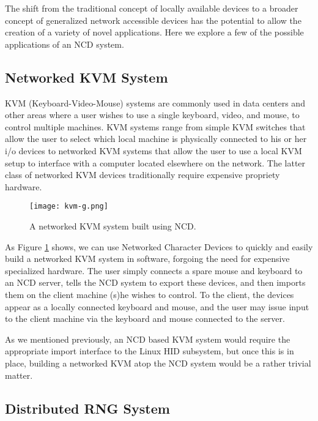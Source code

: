 \documentclass[11pt,twocolumn]{article}
\begin{document}
The shift from the traditional concept of locally available devices to a
broader concept of generalized network accessible devices has the
potential to allow the creation of a variety of novel
applications. Here we explore a few of the possible applications of an
NCD system.

\subsection{Networked KVM System}
\label{sec:networkedkvm}

KVM (Keyboard-Video-Mouse) systems are commonly used in data centers
and other areas where a user wishes to use a single keyboard, video,
and mouse, to control multiple machines. KVM systems range from simple KVM
switches that allow the user to select which local machine is
physically connected to his or her i/o devices to
networked KVM systems that allow the user to use a
local KVM setup to interface with a computer located elsewhere on the
network. The latter class of networked KVM devices traditionally require
expensive propriety hardware.

\begin{figure}[h]
  \centering
  \texttt{[image: kvm-g.png]}
  \caption{A networked KVM system built using NCD.}
  \label{fig:kvm}
\end{figure}

As Figure \ref{fig:kvm} shows, we can use Networked Character Devices
to quickly and easily build a networked KVM system in software,
forgoing the need for expensive specialized hardware. The user simply
connects a spare mouse and keyboard to an NCD server, tells the NCD
system to export these devices, and then imports them on the client
machine (s)he wishes to control. To the client, the devices appear as
a locally connected keyboard and mouse, and the user may issue input to
the client machine via the keyboard and mouse connected to the
server.

As we mentioned previously, an NCD based KVM system would require the
appropriate import interface to the Linux HID subsystem, but once this is
in place, building a networked KVM atop the NCD system would be a
rather trivial matter.

\subsection{Distributed RNG System}
\label{sec:distributedrng}
\end{document}

